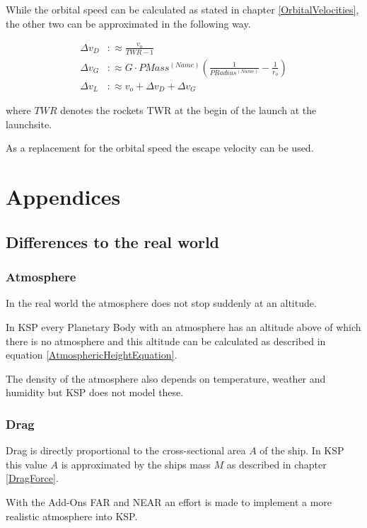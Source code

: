 \documentclass[11pt]{report}
\newcommand{\dv}{{\Delta}{v}}
\begin{document}
While the orbital speed can be calculated as stated in chapter
\ref{OrbitalVelocities}, the other two can be approximated in the
following way. \cite{AscentDeltaVApproximationFormula}

\begin{align}
  \dv_D & :\approx \frac{v_o}{TWR-1}\\
  \dv_G & :\approx G\cdot PMass^{(Name)}\left(\frac{1}{PRadius^{(Name)}}-\frac{1}{r_o}\right)\\
  \dv_L & :\approx v_o + \dv_D + \dv_G
\end{align}

where $TWR$ denotes the rockets TWR at the begin of the launch at the
launchsite.

As a replacement for the orbital speed the escape velocity
\cite{EscapeVelocity} can be used.

\part{Appendices}

\chapter{Differences to the real world}\label{RealWorldDifferences}

\section{Atmosphere}

In the real world the atmosphere does not stop suddenly at an
altitude.

In KSP every Planetary Body with an atmosphere has an altitude above
of which there is no atmosphere and this altitude can be calculated as
described in equation \eqref{AtmosphericHeightEquation}.

The density of the atmosphere also depends on temperature, weather and
humidity \cite{RealDensity} but KSP does not model these.

\section{Drag}

Drag is directly proportional to the cross-sectional area $A$ of the
ship.  In KSP this value $A$ is approximated by the ships mass $M$ as
described in chapter \ref{DragForce}.

With the Add-Ons FAR \cite{FAR} and NEAR \cite{NEAR} an effort is made
to implement a more realistic atmosphere into KSP.
\end{document}
